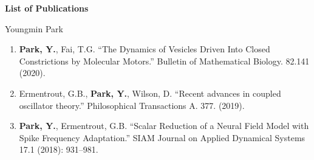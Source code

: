 \documentclass[a4paper,11pt]{article}
\begin{document}
\begin{center}
\Large \textbf{List of Publications}

\Large Youngmin Park
\end{center}

\begin{enumerate}
 \item \textbf{Park, Y.}, Fai, T.G. ``The Dynamics of Vesicles Driven Into Closed Constrictions by Molecular Motors.'' Bulletin of Mathematical Biology. 82.141 (2020).
 \item Ermentrout, G.B., \textbf{Park, Y.}, Wilson, D. ``Recent advances in coupled oscillator theory.'' Philosophical Transactions A. 377. (2019).
 \item \textbf{Park, Y.}, Ermentrout, G.B. ``Scalar Reduction of a Neural Field Model with Spike Frequency Adaptation.'' SIAM Journal on Applied Dynamical Systems 17.1 (2018): 931--981.
\end{enumerate}
\end{document}
